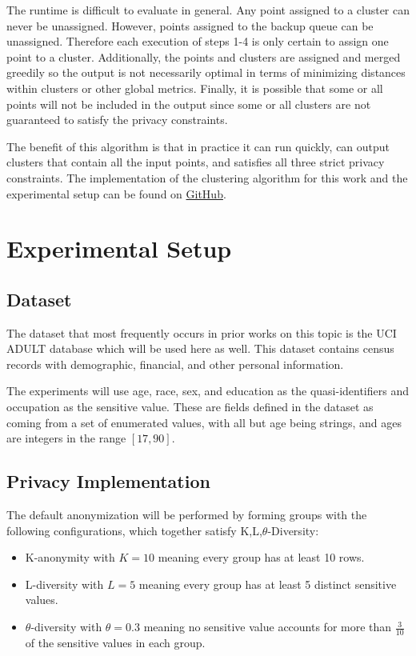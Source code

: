The runtime is difficult to evaluate in general. Any point assigned to a cluster can never be unassigned. However, points assigned to the backup queue can be unassigned. Therefore each execution of steps 1-4 is only certain to assign one point to a cluster. Additionally, the points and clusters are assigned and merged greedily so the output is not necessarily optimal in terms of minimizing distances within clusters or other global metrics. Finally, it is possible that some or all points will not be included in the output since some or all clusters are not guaranteed to satisfy the privacy constraints.

The benefit of this algorithm is that in practice it can run quickly, can output clusters that contain all the input points, and satisfies all three strict privacy constraints. The implementation of the clustering algorithm for this work and the experimental setup can be found on \hyperlink{https://github.com/SamBoger/Query-Accuracy-on-l-Diversity}{GitHub}.

\section{Experimental Setup}

\subsection{Dataset}
The dataset that most frequently occurs in prior works on this topic is the UCI ADULT database\cite{adultDatabase} which will be used here as well. This dataset contains census records with demographic, financial, and other personal information.

The experiments will use age, race, sex, and education as the quasi-identifiers and occupation as the sensitive value. These are fields defined in the dataset as coming from a set of enumerated values, with all but age being strings, and ages are integers in the range $[17,90]$.


\subsection{Privacy Implementation}
The default anonymization will be performed by forming groups with the following configurations, which together satisfy K,L,$\theta$-Diversity:
\begin{itemize}
    \item K-anonymity with $K=10$ meaning every group has at least 10 rows.
    \item L-diversity with $L=5$ meaning every group has at least 5 distinct sensitive values.
    \item $\theta$-diversity with $\theta=0.3$ meaning no sensitive value accounts for more than $\frac{3}{10}$ of the sensitive values in each group.
\end{itemize}

